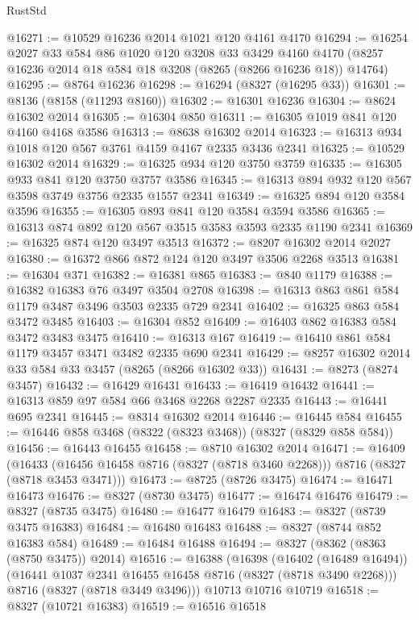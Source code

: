 \begin{lexlean}{RustStd}
\begin{coremodule}
@16271 := @10529 @16236 @2014 @1021 @120 @4161 @4170
@16294 := @16254
    @2027
    @33
    @584
    @86
    @1020
    @120
    @3208
    @33
    @3429
    @4160
    @4170
    (@8257 @16236 @2014 @18 @584 @18 @3208 (@8265 (@8266 @16236 @18)) @14764)
@16295 := @8764 @16236
@16298 := @16294 (@8327 (@16295 @33))
@16301 := @8136 (@8158 (@11293 @8160))
@16302 := @16301 @16236
@16304 := @8624 @16302 @2014
@16305 := @16304 @850
@16311 := @16305 @1019 @841 @120 @4160 @4168 @3586
@16313 := @8638 @16302 @2014
@16323 := @16313 @934 @1018 @120 @567 @3761 @4159 @4167 @2335 @3436 @2341
@16325 := @10529 @16302 @2014
@16329 := @16325 @934 @120 @3750 @3759
@16335 := @16305 @933 @841 @120 @3750 @3757 @3586
@16345 := @16313 @894 @932 @120 @567 @3598 @3749 @3756 @2335 @1557 @2341
@16349 := @16325 @894 @120 @3584 @3596
@16355 := @16305 @893 @841 @120 @3584 @3594 @3586
@16365 := @16313 @874 @892 @120 @567 @3515 @3583 @3593 @2335 @1190 @2341
@16369 := @16325 @874 @120 @3497 @3513
@16372 := @8207 @16302 @2014 @2027
@16380 := @16372 @866 @872 @124 @120 @3497 @3506 @2268 @3513
@16381 := @16304 @371
@16382 := @16381 @865
@16383 := @840 @1179
@16388 := @16382 @16383 @76 @3497 @3504 @2708
@16398 := @16313 @863 @861 @584 @1179 @3487 @3496 @3503 @2335 @729 @2341
@16402 := @16325 @863 @584 @3472 @3485
@16403 := @16304 @852
@16409 := @16403 @862 @16383 @584 @3472 @3483 @3475
@16410 := @16313 @167
@16419 := @16410 @861 @584 @1179 @3457 @3471 @3482 @2335 @690 @2341
@16429 := @8257 @16302 @2014 @33 @584 @33 @3457 (@8265 (@8266 @16302 @33))
@16431 := @8273 (@8274 @3457)
@16432 := @16429 @16431
@16433 := @16419 @16432
@16441 := @16313 @859 @97 @584 @66 @3468 @2268 @2287 @2335
@16443 := @16441 @695 @2341
@16445 := @8314 @16302 @2014
@16446 := @16445 @584
@16455 := @16446 @858 @3468 (@8322 (@8323 @3468)) (@8327 (@8329 @858 @584))
@16456 := @16443 @16455
@16458 := @8710 @16302 @2014
@16471 := @16409
    (@16433 (@16456 @16458 @8716 (@8327 (@8718 @3460 @2268))) @8716 (@8327 (@8718 @3453 @3471)))
@16473 := @8725 (@8726 @3475)
@16474 := @16471 @16473
@16476 := @8327 (@8730 @3475)
@16477 := @16474 @16476
@16479 := @8327 (@8735 @3475)
@16480 := @16477 @16479
@16483 := @8327 (@8739 @3475 @16383)
@16484 := @16480 @16483
@16488 := @8327 (@8744 @852 @16383 @584)
@16489 := @16484 @16488
@16494 := @8327 (@8362 (@8363 (@8750 @3475)) @2014)
@16516 := @16388
    (@16398
      (@16402 (@16489 @16494))
      (@16441 @1037 @2341 @16455 @16458 @8716 (@8327 (@8718 @3490 @2268)))
      @8716
      (@8327 (@8718 @3449 @3496)))
    @10713
    @10716
    @10719
@16518 := @8327 (@10721 @16383)
@16519 := @16516 @16518

\end{coremodule}
\end{lexlean}
